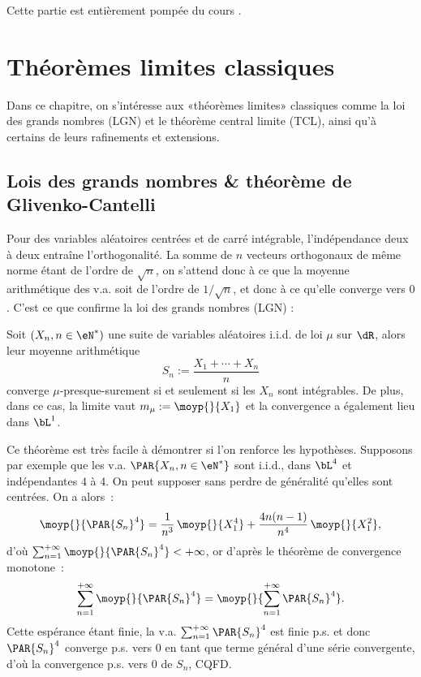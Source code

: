 Cette partie est entièrement pompée du cours \cite{ChaDjelil}.

\chapter{Théorèmes limites classiques}
%
%

Dans ce chapitre, on s'intéresse aux «théorèmes limites» classiques comme la
loi des grands nombres (LGN) et le théorème central limite (TCL), ainsi qu'à
certains de leurs rafinements et extensions.

%
\section{Lois des grands nombres \& théorème de Glivenko-Cantelli}\label{se:lgn}
%

Pour des variables aléatoires centrées et de carré intégrable, l'indépendance
deux à deux entraîne l'orthogonalité. La somme de $n$ vecteurs orthogonaux de
même norme étant de l'ordre de $\sqrt{n}$, on s'attend donc à ce que la
moyenne arithmétique des v.a. soit de l'ordre de $1/\sqrt{n}$, et donc à ce
qu'elle converge vers $0$. C'est ce que confirme la loi des grands nombres
(LGN) :

\begin{theorem}
  Soit $(X_n,n\in\eN^*)$ une suite de variables aléatoires i.i.d. de loi $\mu$ sur
  $\dR$, alors leur moyenne arithmétique 
  $$
  S_n:=\frac{X_1+\cdots+X_n}{n}
  $$
  converge $\mu$-presque-surement si et seulement si les $X_n$ sont
  intégrables. De plus, dans ce cas, la limite vaut $m_\mu:=\moyp{}{X_1}$ et la
  convergence a également lieu dans $\bL^1$.
\end{theorem}

Ce théorème est très facile à démontrer si l'on renforce les hypothèses.
Supposons par exemple que les v.a. $\PAR{X_n,n\in\eN^*}$ sont i.i.d., dans
$\bL^4$ et indépendantes $4$ à $4$. On peut supposer sans perdre de généralité
qu'elles sont centrées. On a alors~:
$$
\moyp{}{\PAR{S_n}^4}=\frac{1}{n^3}\,\moyp{}{X_1^4}+\frac{4n(n-1)}{n^4}\,\moyp{}{X_1^2},
$$
d'où $\sum_{n=1}^{+\infty}\moyp{}{\PAR{S_n}^4}<+\infty$, or d'après le théorème
de convergence monotone~:
$$
\sum_{n=1}^{+\infty}\moyp{}{\PAR{S_n}^4}
=\moyp{}{\sum_{n=1}^{+\infty}\PAR{S_n}^4}.
$$
Cette espérance étant finie, la v.a. $\sum_{n=1}^{+\infty}\PAR{S_n}^4$ est
finie p.s. et donc $\PAR{S_n}^4$ converge p.s. vers $0$ en tant que terme
général d'une série convergente, d'où la convergence p.s. vers $0$ de $S_n$,
CQFD.

